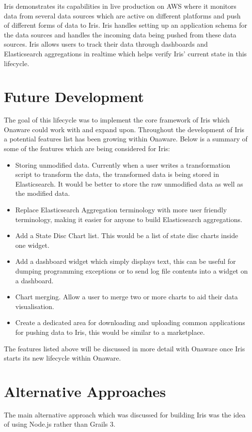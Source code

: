 \documentclass[12pt,a4paper,titlepage]{report}
\begin{document}
Iris demonstrates its capabilities in live production on AWS where it monitors data from several data sources which are active on different platforms and push of different forms of data to Iris. Iris handles setting up an application schema for the data sources and handles the incoming data being pushed from these data sources. Iris allows users to track their data through dashboards and Elasticsearch aggregations in realtime which helps verify Iris' current state in this lifecycle.

\section{Future Development}
The goal of this lifecycle was to implement the core framework of Iris which Onaware could work with and expand upon. Throughout the development of Iris a potential features list has been growing within Onaware. Below is a summary of some of the features which are being considered for Iris:
\begin{itemize}
    \item Storing unmodified data. Currently when a user writes a transformation script to transform the data, the transformed data is being stored in Elasticsearch. It would be better to store the raw unmodified data as well as the modified data.
    \item Replace Elasticsearch Aggregation terminology with more user friendly terminology, making it easier for anyone to build Elasticsearch aggregations.
    \item Add a State Disc Chart list. This would be a list of state disc charts inside one widget.
    \item Add a dashboard widget which simply displays text, this can be useful for dumping programming exceptions or to send log file contents into a widget on a dashboard.
    \item Chart merging. Allow a user to merge two or more charts to aid their data visualisation.
    \item Create a dedicated area for downloading and uploading common applications for pushing data to Iris, this would be similar to a marketplace.
\end{itemize}
The features listed above will be discussed in more detail with Onaware once Iris starts its new lifecycle within Onaware.

\section{Alternative Approaches}
The main alternative approach which was discussed for building Iris was the idea of using Node.js rather than Grails 3.
\end{document}
